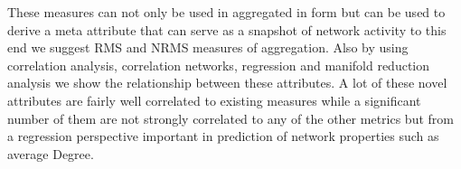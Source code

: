 These measures can not only be used in aggregated in form but can be used to derive a meta attribute that can serve as a snapshot of network activity to this end we suggest RMS and NRMS measures of aggregation. Also by using correlation analysis, correlation networks, regression and manifold reduction analysis we show the relationship between these attributes. A lot of these novel attributes are fairly well correlated to existing measures while a significant number of them are not strongly correlated to any of the other metrics but from a regression perspective important in prediction of network properties such as average Degree. \\

